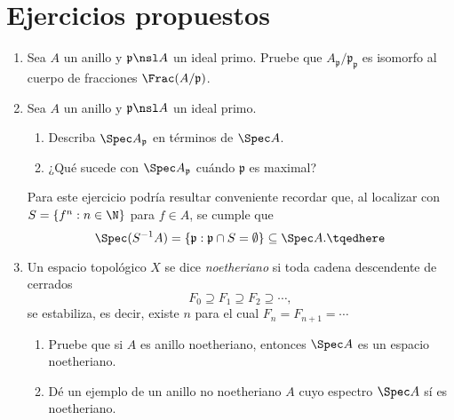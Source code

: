 \documentclass[11pt, reqno]{amsart}
\begin{document}
\section{Ejercicios propuestos}
\begin{enumerate}
	\item\lookright
		Sea $A$ un anillo y $\mathfrak{p} \nsl A$ un ideal primo.
		Pruebe que $A_{\mathfrak{p}}/\mathfrak{p_p}$ es isomorfo al cuerpo de fracciones
		$\Frac(A/\mathfrak{p})$.

	\item Sea $A$ un anillo y $\mathfrak{p} \nsl A$ un ideal primo.
		\begin{enumerate}
			\item Describa $\Spec A_{\mathfrak{p}}$ en términos de $\Spec A$.
			\item ¿Qué sucede con $\Spec A_{\mathfrak{p}}$ cuándo $\mathfrak{p}$ es maximal?
		\end{enumerate}

		\begin{hint}
			Para este ejercicio podría resultar conveniente recordar que, al localizar con $S = \{ f^n : n
			\in \N \}$ para $f \in A$, se cumple que
			\begin{equation}
				\Spec(S^{-1}A) = \{ \mathfrak{p} : \mathfrak{p} \cap S = \emptyset \} \subseteq \Spec A.
				\tqedhere
			\end{equation}
		\end{hint}

	\item Un espacio topológico $X$ se dice \emph{noetheriano} si toda cadena descendente de cerrados
		\[
			F_0 \supseteq F_1 \supseteq F_2 \supseteq \cdots,
		\]
		se estabiliza, es decir, existe $n$ para el cual $F_n = F_{n+1} = \cdots$

		\begin{enumerate}
			\item Pruebe que si $A$ es anillo noetheriano, entonces $\Spec A$ es un espacio noetheriano.
			\item\lookup
				Dé un ejemplo de un anillo no noetheriano $A$ cuyo espectro $\Spec A$ sí es noetheriano.
		\end{enumerate}
\end{enumerate}


\printbibliography
\end{document}
